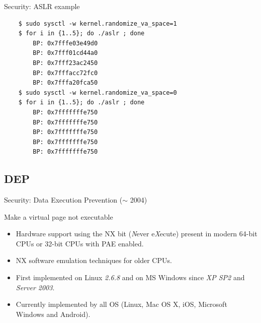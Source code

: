 \begin{frame}[fragile]{Security: ASLR example}
	\begin{lstlisting}
	$ sudo sysctl -w kernel.randomize_va_space=1
	$ for i in {1..5}; do ./aslr ; done
		BP: 0x7fffe03e49d0
		BP: 0x7fff01cd44a0
		BP: 0x7fff23ac2450
		BP: 0x7fffacc72fc0
		BP: 0x7fffa20fca50
	$ sudo sysctl -w kernel.randomize_va_space=0
	$ for i in {1..5}; do ./aslr ; done
		BP: 0x7fffffffe750
		BP: 0x7fffffffe750
		BP: 0x7fffffffe750
		BP: 0x7fffffffe750
		BP: 0x7fffffffe750
	\end{lstlisting}
\end{frame}

\subsection{DEP}
\begin{frame}{Security: Data Execution Prevention ($\sim$ 2004)}
	\begin{block}{Make a virtual page not executable}
		\begin{itemize}
			\item Hardware support using the NX bit (\emph{N}ever e\emph{X}ecute)
				present in modern 64-bit CPUs or 32-bit CPUs with PAE enabled.
			\item NX software emulation techniques for older CPUs.
			\item First implemented on Linux \emph{2.6.8} and on MS Windows since
				\emph{XP SP2} and \emph{Server 2003}.
			\item Currently implemented by all OS (Linux, Mac OS X, iOS, Microsoft Windows and Android).
		\end{itemize}
	\end{block}
\end{frame}
